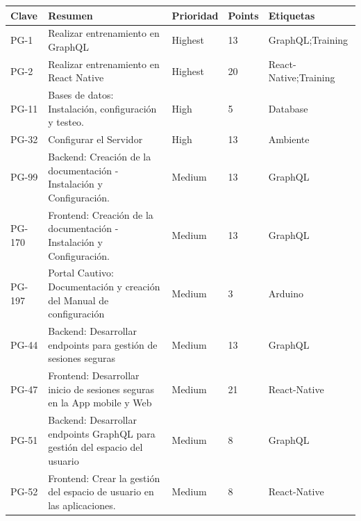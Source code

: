\documentclass[11pt]{charter}
\begin{document}
\begin{tabularx}{\linewidth}{@{}p{1.3cm} p{14cm} p{1.7cm} p{1.5cm} p{2.5cm}@{}}
\hline
\rowcolor[HTML]{C0C0C0} 
\textbf{Clave} & \textbf{Resumen} & \textbf{Prioridad} & \textbf{Points} &  \textbf{Etiquetas} \\ \hline
PG-1   & Realizar entrenamiento en GraphQL                                                                      & Highest   & 13                         & GraphQL;Training      \\
PG-2   & Realizar entrenamiento en React Native                                                                 & Highest   & 20                         & React-Native;Training \\
PG-11  & Bases de datos: Instalación,  configuración y testeo.                                                  & High      & 5                          & Database              \\
PG-32  & Configurar el Servidor                                                                                 & High      & 13                         & Ambiente              \\
PG-99  & Backend: Creación de la documentación - Instalación y Configuración.                                   & Medium    & 13                         & GraphQL               \\
PG-170 & Frontend: Creación de la documentación - Instalación y Configuración.                                  & Medium    & 13                         & GraphQL               \\
PG-197 & Portal Cautivo: Documentación y creación del Manual de configuración                                   & Medium    & 3                          & Arduino               \\
PG-44  & Backend: Desarrollar endpoints para gestión de sesiones seguras                                        & Medium    & 13                         & GraphQL               \\
PG-47  & Frontend: Desarrollar inicio de sesiones seguras en la App mobile y Web                                & Medium    & 21                         & React-Native          \\
PG-51  & Backend: Desarrollar endpoints GraphQL para gestión del espacio del usuario                            & Medium    & 8                          & GraphQL               \\
PG-52  & Frontend: Crear la gestión del espacio de usuario en las aplicaciones.                                 & Medium    & 8                          & React-Native          \\

\end{tabularx}
\end{document}
